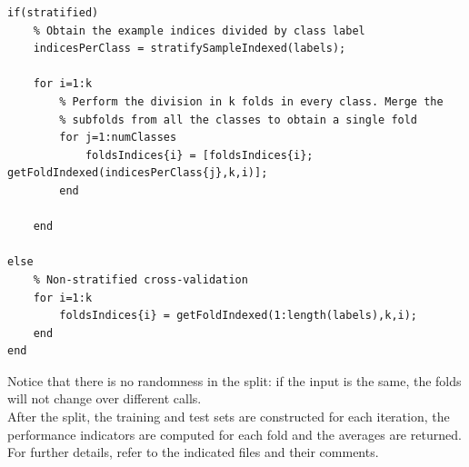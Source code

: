\documentclass{article}
\begin{document}
\begin{lstlisting}[firstnumber=14]
if(stratified)
    % Obtain the example indices divided by class label
    indicesPerClass = stratifySampleIndexed(labels);
    
    for i=1:k
        % Perform the division in k folds in every class. Merge the
        % subfolds from all the classes to obtain a single fold
        for j=1:numClasses
            foldsIndices{i} = [foldsIndices{i}; getFoldIndexed(indicesPerClass{j},k,i)];
        end
        
    end    
    
else
    % Non-stratified cross-validation
    for i=1:k
        foldsIndices{i} = getFoldIndexed(1:length(labels),k,i);
    end
end
\end{lstlisting}
Notice that there is no randomness in the split: if the input is the same, the folds will not change over different calls.\\
After the split, the training and test sets are constructed for each iteration, the performance indicators are computed for each fold and the averages are returned. For further details, refer to the indicated files and their comments.
\end{document}
